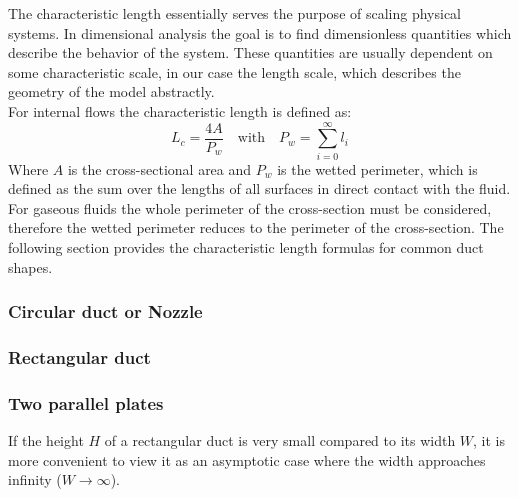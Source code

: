 The characteristic length essentially serves the purpose of scaling physical systems.
In dimensional analysis the goal is to find dimensionless quantities which describe the behavior of the system.
These quantities are usually dependent on some characteristic scale, in our case the length scale, which describes the geometry of the model abstractly.\\
For internal flows the characteristic length is defined as:
\begin{equation}
	L_c=\frac{4A}{P_w} \quad \text{with} \quad P_w = \sum^{\infty}_{i=0} l_i
\end{equation}
Where $A$ is the cross-sectional area and $P_w$ is the wetted perimeter, which is defined as the sum over the lengths of all surfaces in direct contact with the fluid.
For gaseous fluids the whole perimeter of the cross-section must be considered, therefore the wetted perimeter reduces to the perimeter of the cross-section.
The following section provides the characteristic length formulas for common duct shapes.
\cite{leishman_internal_2023}

\subsubsection*{Circular duct or Nozzle}



\subsubsection*{Rectangular duct}



\subsubsection*{Two parallel plates}

If the height $H$ of a rectangular duct is very small compared to its width $W$, it is more convenient to view it as an asymptotic case where the width approaches infinity ($W \to \infty$).


